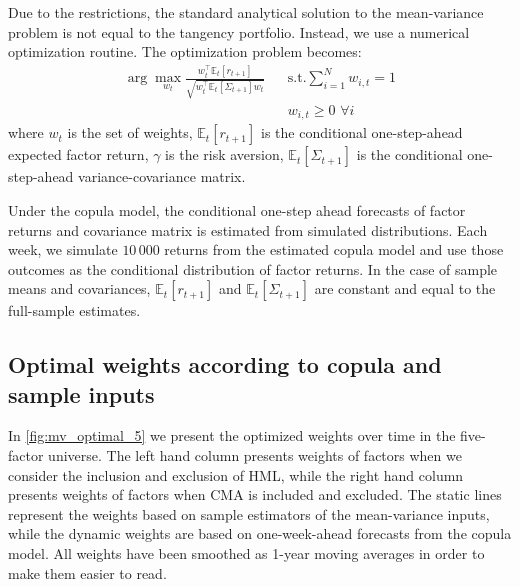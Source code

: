 
Due to the restrictions, the standard analytical solution to the mean-variance problem is not equal to the tangency portfolio. Instead, we use a numerical optimization routine. The optimization problem becomes:
\begin{align*}
  \arg\!\max_{w_t} \frac{w_t^\top \mathbb{E}_t[r_{t+1}]}{\sqrt{w_t^\top \mathbb{E}_t[\Sigma_{t+1}] w_t}}
    && \text{s.t.} \sum_{i=1}^N w_{i,t} = 1 \\
    && w_{i,t} \ge 0 \,\, \forall i
\end{align*}
where $w_t$ is the set of weights, $\mathbb{E}_t[r_{t+1}]$ is the conditional one-step-ahead expected factor return, $\gamma$ is the risk aversion, $\mathbb{E}_t[\Sigma_{t+1}]$ is the conditional one-step-ahead variance-covariance matrix. 

Under the copula model, the conditional one-step ahead forecasts of factor returns and covariance matrix is estimated from simulated distributions. Each week, we simulate $10\,000$ returns from the estimated copula model and use those outcomes as the conditional distribution of factor returns. In the case of sample means and covariances, $\mathbb{E}_t[r_{t+1}]$ and $\mathbb{E}_t[\Sigma_{t+1}]$ are constant and equal to the full-sample estimates.

\subsection{Optimal weights according to copula and sample inputs}
In \autoref{fig:mv_optimal_5} we present the optimized weights over time in the five-factor universe. The left hand column presents weights of factors when we consider the inclusion and exclusion of HML, while the right hand column presents weights of factors when CMA is included and excluded. The static lines represent the weights based on sample estimators of the mean-variance inputs, while the dynamic weights are based on one-week-ahead forecasts from the copula model. All weights have been smoothed as 1-year moving averages in order to make them easier to read. 

